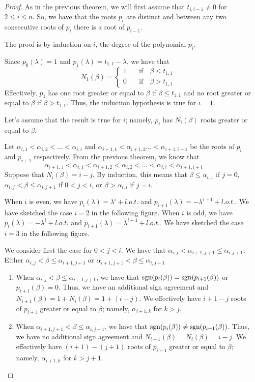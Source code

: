 \begin{proof}
As in the previous theorem, we will first assume that
$t_{i,i-1} \neq 0$ for $2\leq i \leq n$.  So, we have that the roots
$p_i$ are distinct and between any two consecutive roots of $p_i$
there is a root of $p_{i-1}$.

The proof is by induction on $i$, the degree of the polynomial $p_i$.

Since $p_0(\lambda) = 1$ and $p_1(\lambda) = t_{1,1}-\lambda$, we have
that
\[
N_1(\beta) = \begin{cases}
1 & \quad \text{if} \quad \beta \leq t_{1,1} \\
0 & \quad \text{if} \quad \beta > t_{1,1}    
\end{cases}
\]
Effectively, $p_1$ has one root greater or equal to $\beta$ if
$\beta \leq t_{1,1}$ and no root greater or equal to $\beta$ if
$\beta > t_{1,1}$.  Thus, the induction hypothesis is true for $i=1$.

Let's assume that the result is true for $i$; namely, $p_i$ has
$N_i(\beta)$ roots greater or equal to $\beta$.

Let $\alpha_{i,1} < \alpha_{i,2} < \ldots < \alpha_{i,i}$ and
$\alpha_{i+1,1} < \alpha_{i+1,2} \ldots < \alpha_{i+1,i+1}$ be the
roots of $p_i$ and $p_{i+1}$ respectively.  From the previous theorem,
we know that
\[
  \alpha_{i+1,1} < \alpha_{i,1} < \alpha_{i+1,2} < \alpha_{i,2} < \ldots
  < \alpha_{i,i} < \alpha_{i+1,i+1}  \quad .
\]
Suppose that $N_i(\beta) = i-j$.  By induction, this means that
$\beta \leq \alpha_{i,1}$ if $j=0$,
$\alpha_{i,j} < \beta \leq \alpha_{i,j+1}$ if $0 < j < i$,
or $\beta > \alpha_{i,i}$ if $j=i$.

When $i$ is even, we have $p_i(\lambda) = \lambda^i + l.o.t.$ and
$p_{i+1}(\lambda) = -\lambda^{i+1} + l.o.t.$.  We have sketched
the case $i=2$ in the following figure.
When $i$ is odd, we have $p_i(\lambda) = -\lambda^i + l.o.t.$ and
$p_{i+1}(\lambda) = \lambda^{i+1} + l.o.t.$.  We have sketched
the case $i=3$ in the following figure.

We consider first the case for $0 < j < i$.  We have that
$\alpha_{i,j} < \alpha_{i+1,j+1} \leq \alpha_{i,j+1}$.
Either $\alpha_{i,j} < \beta \leq \alpha_{i+1,j+1}$
or $\alpha_{i+1,j+1} < \beta \leq \alpha_{i,j+1}$

\begin{enumerate}
\item When $\alpha_{i,j} < \beta \leq \alpha_{i+1,j+1}$, we have that
$\operatorname{sgn}(p_i(\beta))=\operatorname{sgn}(p_{i+1}(\beta))$ or $p_{i+1}(\beta) = 0$.
Thus, we have an additional sign agreement and
$N_{i+1}(\beta) = 1 + N_i(\beta) = 1 + (i-j)$.
We effectively have $i+1-j$ roots of $p_{i+1}$ greater or equal to
$\beta$; namely, $\alpha_{i+1,k}$ for $k>j$.
\item When $\alpha_{i+1,j+1} < \beta \leq \alpha_{i,j+1}$, we have that
$\operatorname{sgn}(p_i(\beta)) \neq \operatorname{sgn}(p_{i+1}(\beta))$.
Thus, we have no additional sign agreement and
$N_{i+1}(\beta) =  N_i(\beta) = i-j$.  We effectively have
$(i+1)-(j+1)$ roots of $p_{i+1}$ greater or equal to $\beta$; namely,
$\alpha_{i+1,k}$ for $k>j+1$.
\end{enumerate}


\end{proof}
